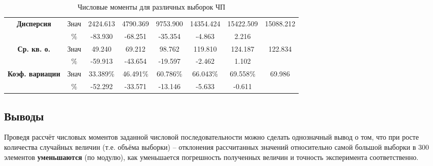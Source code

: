 \begin{table}[h]
{\begin{tabular}{|c|c|c|c|c|c|c|c|}
			\hline
			\multirow{2}{*}{\textbf{Дисперсия}}        & Знач & 2424.613                                                   & 4790.369    & 9753.900    & 14354.424    & 15422.509    & \multirow{2}{*}{15088.212} \\
			\cline{2-7}
			                                           & $\%$ & -83.930                                                    & -68.251     & -35.354     & -4.863       & 2.216        &                            \\
			\hline
			\multirow{2}{*}{\textbf{Ср. кв. о.}}       & Знач & 49.240                                                     & 69.212      & 98.762      & 119.810      & 124.187      & \multirow{2}{*}{122.834}   \\
			\cline{2-7}
			                                           & $\%$ & -59.913                                                    & -43.654     & -19.597     & -2.462       & 1.102        &                            \\
			\hline
			\multirow{2}{*}{\textbf{Коэф. вариации}}   & Знач & 33.389\%                                                   & 46.491\%    & 60.786\%    & 66.043\%     & 69.558\%     & \multirow{2}{*}{69.986}    \\
			\cline{2-7}
			                                           & $\%$ & -52.292                                                    & -33.571     & -13.146     & -5.633       & -0.611       &                            \\
			\hline
		\end{tabular}}
	\caption{Числовые моменты для различных выборок ЧП}
\end{table}

\subsection{Выводы}
Проведя рассчёт числовых моментов заданной числовой последовательности можно сделать однозначный вывод о том, что при росте количества случайных величин (т.е. объёма выборки) -- отклонения рассчитанных значений относительно самой большой выборки в 300 элементов \textbf{уменьшаются} (по модулю), как уменьшается погрешность полученных величин и точность эксперимента соответственно.

